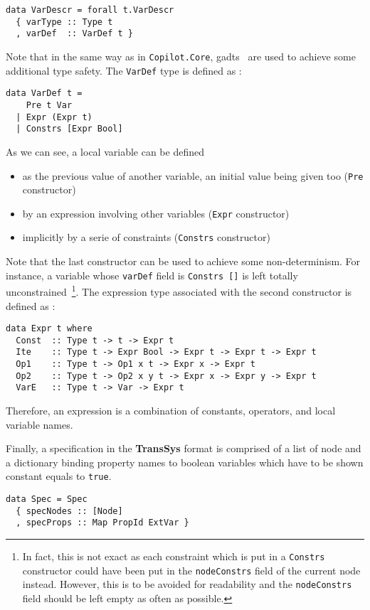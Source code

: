 \begin{lstlisting}[frame=single]
data VarDescr = forall t.VarDescr
  { varType :: Type t
  , varDef  :: VarDef t }
\end{lstlisting}
Note that in the same way as in \texttt{Copilot.Core}, {\sc
  gadt}s~\cite{Xi2003,CheneyHinze03, Johann2008} are used to achieve some additional type safety. The \texttt{VarDef} type is defined as :
\begin{lstlisting}[frame=single]
data VarDef t =
    Pre t Var
  | Expr (Expr t)
  | Constrs [Expr Bool]
\end{lstlisting}
As we can see, a local variable can be defined
\begin{itemize}
\item as the previous value of another variable, an initial value being given too (\texttt{Pre} constructor)
\item by an expression involving other variables (\texttt{Expr} constructor)
\item implicitly by a serie of constraints (\texttt{Constrs} constructor)
\end{itemize}
Note that the last constructor can be used to achieve some non-determinism. For instance, a variable whose \texttt{varDef} field is \texttt{Constrs []} is left totally unconstrained~\footnote{In fact, this is not exact as each constraint which is put in a \texttt{Constrs} constructor could have been put in the \texttt{nodeConstrs} field of the current node instead. However, this is to be avoided for readability and the \texttt{nodeConstrs} field should be left empty as often as possible.
}. The expression type associated with the second constructor is defined as :
\begin{lstlisting}[frame=single]
data Expr t where
  Const  :: Type t -> t -> Expr t
  Ite    :: Type t -> Expr Bool -> Expr t -> Expr t -> Expr t
  Op1    :: Type t -> Op1 x t -> Expr x -> Expr t
  Op2    :: Type t -> Op2 x y t -> Expr x -> Expr y -> Expr t
  VarE   :: Type t -> Var -> Expr t
\end{lstlisting}
Therefore, an expression is a combination of constants, operators, and local variable names.


Finally, a specification in the \textbf{TransSys} format is comprised
of  a list of node and a dictionary binding property names to boolean variables which have to be shown constant equals to \texttt{true}.
\begin{lstlisting}[frame=single]
data Spec = Spec
  { specNodes :: [Node]
  , specProps :: Map PropId ExtVar }
\end{lstlisting}


